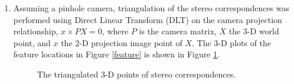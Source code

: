\documentclass[12pt]{article} %
\begin{document}
\begin{enumerate}[label=\alph*)]
\newpage

\item %
Assuming a pinhole camera, triangulation of the stereo correspondences was performed using Direct Linear Transform (DLT) on the camera projection relationship, $x\times PX = 0$, where $P$ is the camera matrix, $X$ the 3-D world point, and $x$ the 2-D projection image point of $X$. The 3-D plots of the feature locations in Figure \ref{feature} is shown in Figure \ref{3d}.

\begin{figure}[h!]
	\centering
	
	
	\caption{The triangulated 3-D points of stereo correspondences.}
	\label{3d}
\end{figure}


\end{enumerate}
\end{document}
